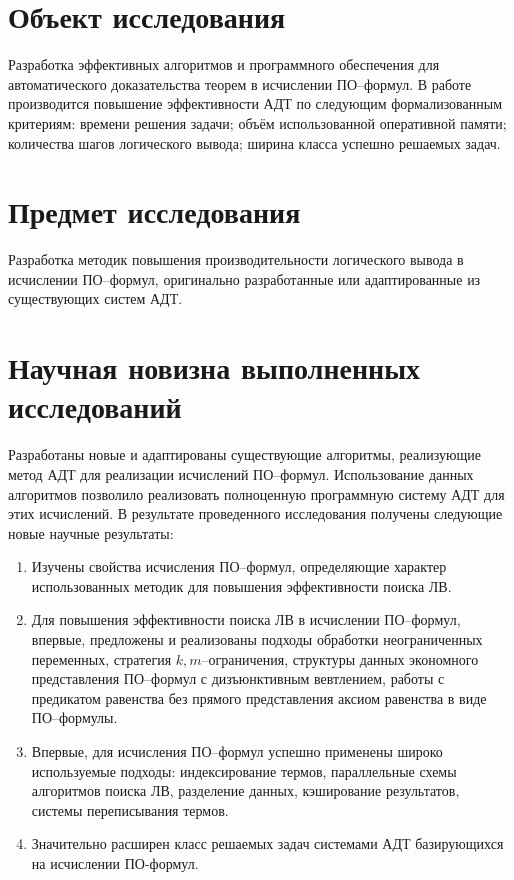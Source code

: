 \section*{Объект исследования} 
Разработка эффективных алгоритмов и программного обеспечения для автоматического доказательства теорем в исчислении ПО--формул. В работе производится повышение эффективности АДТ по следующим формализованным критериям: времени решения задачи; объём использованной оперативной памяти; количества шагов логического вывода; ширина класса успешно решаемых задач. %


\section*{Предмет исследования}
Разработка методик повышения производительности логического вывода в исчислении ПО--формул, оригинально разработанные или адаптированные из существующих систем АДТ.



\section*{Научная новизна выполненных исследований}
Разработаны новые и адаптированы существующие алгоритмы, реализующие метод АДТ для реализации исчислений ПО--формул. Использование данных алгоритмов позволило реализовать полноценную программную систему АДТ для этих исчислений. В результате проведенного исследования получены следующие новые научные результаты:
\begin{enumerate}
\item Изучены свойства исчисления ПО--формул, определяющие характер использованных методик для повышения эффективности поиска ЛВ.
\item Для повышения эффективности поиска ЛВ в исчислении ПО--формул, впервые, предложены и реализованы подходы обработки неограниченных переменных, стратегия $k,m$--ограничения, структуры данных экономного представления ПО--формул с дизъюнктивным вевтлением, работы с предикатом равенства без прямого представления аксиом равенства в виде ПО--формулы. 
\item Впервые, для исчисления ПО--формул успешно применены широко используемые подходы: индексирование термов, параллельные схемы алгоритмов поиска ЛВ, разделение данных, кэширование результатов, системы переписывания термов.
\item Значительно расширен класс решаемых задач системами АДТ базирующихся на исчислении ПО-формул.
\end{enumerate}




